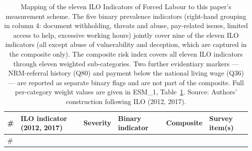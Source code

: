 \documentclass[
  12pt,
  letterpaper,
  DIV=11,
  numbers=noendperiod]{scrartcl}
\begin{document}
\begin{longtable}[]{@{}
  >{\raggedleft\arraybackslash}p{}
  >{\raggedright\arraybackslash}p{}
  >{\centering\arraybackslash}p{}
  >{\raggedright\arraybackslash}p{}
  >{\centering\arraybackslash}p{}
  >{\raggedright\arraybackslash}p{}@{}}
\caption{Mapping of the eleven ILO Indicators of Forced Labour to this
paper's measurement scheme. The five binary prevalence indicators
(right-hand grouping in column 4: document withholding, threats and
abuse, pay-related issues, limited access to help, excessive working
hours) jointly cover nine of the eleven ILO indicators (all except abuse
of vulnerability and deception, which are captured in the composite
only). The composite risk index covers all eleven ILO indicators through
eleven weighted sub-categories. Two further evidentiary markers ---
NRM-referral history (Q80) and payment below the national living wage
(Q36) --- are reported as separate binary flags and are not part of the
composite. Full per-category weight values are given in ESM\_1,
Table~\ref{tbl-indicator-mapping}. Source: Authors' construction
following ILO (2012, 2017).}\label{tbl-indicator-mapping}\tabularnewline
\toprule\noalign{}
\begin{minipage}[b]{\linewidth}\raggedleft
\#
\end{minipage} & \begin{minipage}[b]{\linewidth}\raggedright
ILO indicator (2012, 2017)
\end{minipage} & \begin{minipage}[b]{\linewidth}\centering
Severity
\end{minipage} & \begin{minipage}[b]{\linewidth}\raggedright
Binary indicator
\end{minipage} & \begin{minipage}[b]{\linewidth}\centering
Composite
\end{minipage} & \begin{minipage}[b]{\linewidth}\raggedright
Survey item(s)
\end{minipage} \\
\midrule\noalign{}
\endfirsthead
\toprule\noalign{}
\begin{minipage}[b]{\linewidth}\raggedleft
\#
\end{minipage} & \begin{minipage}[b]{\linewidth}\raggedright

\end{minipage}
\end{longtable}
\end{document}
